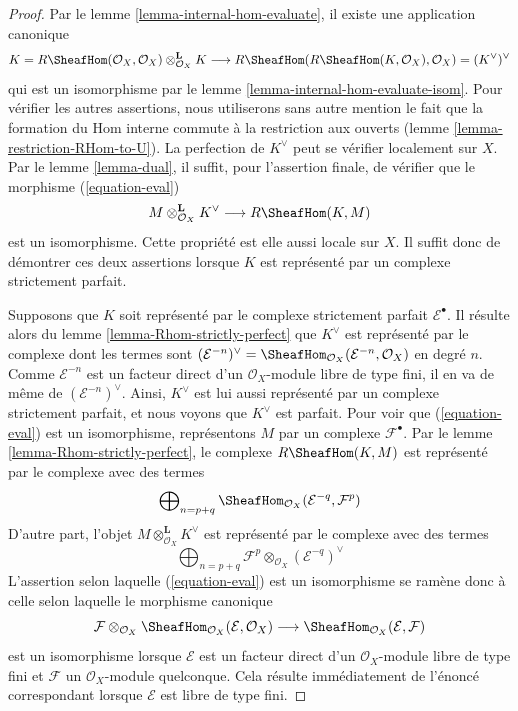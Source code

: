 {\begin{proof}
Par le lemme \ref{lemma-internal-hom-evaluate}, il existe une application canonique $$
K = R\SheafHom(\mathcal{O}_X, \mathcal{O}_X)
\otimes_{\mathcal{O}_X}^\mathbf{L} K \longrightarrow
R\SheafHom(R\SheafHom(K, \mathcal{O}_X), \mathcal{O}_X) =
(K^\vee)^\vee
$$ qui est un isomorphisme par le lemme \ref{lemma-internal-hom-evaluate-isom}. Pour vérifier les autres assertions, nous utiliserons sans autre mention le fait que la formation du Hom interne commute à la restriction aux ouverts (lemme \ref{lemma-restriction-RHom-to-U}). La perfection de $K^\vee$ peut se vérifier localement sur $X$. Par le lemme \ref{lemma-dual}, il suffit, pour l'assertion finale, de vérifier que le morphisme (\ref{equation-eval}) $$
M \otimes^\mathbf{L}_{\mathcal{O}_X} K^\vee
\longrightarrow
R\SheafHom(K, M)
$$ est un isomorphisme. Cette propriété est elle aussi locale sur $X$. Il suffit donc de démontrer ces deux assertions lorsque $K$ est représenté par un complexe strictement parfait.

\medskip\noindent

Supposons que $K$ soit représenté par le complexe strictement parfait
$\mathcal{E}^\bullet$. Il résulte alors du lemme \ref{lemma-Rhom-strictly-perfect}
que $K^\vee$ est représenté par le complexe dont les termes sont
$(\mathcal{E}^{-n})^\vee =
\SheafHom_{\mathcal{O}_X}(\mathcal{E}^{-n}, \mathcal{O}_X)$
en degré $n$. Comme $\mathcal{E}^{-n}$ est un facteur direct d'un $\mathcal{O}_X$-module libre de type fini, il en va de même de $(\mathcal{E}^{-n})^\vee$. Ainsi, $K^\vee$ est lui aussi représenté par un complexe strictement parfait, et nous voyons que $K^\vee$ est parfait. Pour voir que (\ref{equation-eval}) est un isomorphisme, représentons
$M$ par un complexe $\mathcal{F}^\bullet$. Par le lemme \ref{lemma-Rhom-strictly-perfect}, le complexe
$R\SheafHom(K, M)$ est représenté par le complexe avec des termes
$$
\bigoplus\nolimits_{n = p + q}
\SheafHom_{\mathcal{O}_X}(\mathcal{E}^{-q}, \mathcal{F}^p)
$$
D'autre part, l'objet $M \otimes^\mathbf{L}_{\mathcal{O}_X} K^\vee$
est représenté par le complexe avec des termes
$$
\bigoplus\nolimits_{n = p + q}
\mathcal{F}^p \otimes_{\mathcal{O}_X} (\mathcal{E}^{-q})^\vee
$$
L'assertion selon laquelle (\ref{equation-eval}) est un isomorphisme se ramène donc à celle selon laquelle le morphisme canonique
$$
\mathcal{F}
\otimes_{\mathcal{O}_X}
\SheafHom_{\mathcal{O}_X}(\mathcal{E}, \mathcal{O}_X)
\longrightarrow
\SheafHom_{\mathcal{O}_X}(\mathcal{E}, \mathcal{F})
$$
est un isomorphisme lorsque $\mathcal{E}$ est un facteur direct d'un $\mathcal{O}_X$-module libre de type fini et $\mathcal{F}$ un $\mathcal{O}_X$-module quelconque. Cela résulte immédiatement de l'énoncé correspondant lorsque
$\mathcal{E}$ est libre de type fini.


\end{proof}}
